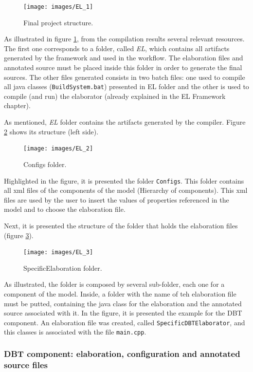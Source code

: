 \begin{figure}[H]
\centerline{
\texttt{[image: images/EL\_1]}
}
\caption{Final project structure.}
\label{fig:el_1} 
\end{figure}

As illustrated in figure \ref{fig:el_1}, from the compilation results several relevant resources. The first one corresponds to a folder, called \textit{EL}, which contains all artifacts generated by the framework and used in the workflow. The elaboration files and annotated source must be placed inside this folder in order to generate the final sources. The other files generated consists in two batch files: one used to compile all java classes (\texttt{BuildSystem.bat}) presented in EL folder and the other is used to compile (and run) the elaborator (already explained in the EL Framework chapter). 

As mentioned, \textit{EL} folder contains the artifacts generated by the compiler. Figure \ref{fig:el_2} shows its structure (left side).

\begin{figure}[H]
\centerline{
\texttt{[image: images/EL\_2]}
}
\caption{Configs folder.}
\label{fig:el_2} 
\end{figure}

Highlighted in the figure, it is presented the folder \texttt{Configs}. This folder contains all xml files of the components of the model (Hierarchy of components). This xml files are used by the user to insert the values of properties referenced in the model and to choose the elaboration file.

Next, it is presented the structure of the folder that holds the elaboration files (figure \ref{fig:el_3}). 

\begin{figure}[H]
\centerline{
\texttt{[image: images/EL\_3]}
}
\caption{SpecificElaboration folder.}
\label{fig:el_3} 
\end{figure}

As illustrated, the folder is composed by several sub-folder, each one for a component of the model. Inside, a folder with the name of teh elaboration file must be putted, containing the java class for the elaboration and the annotated source associated with it. In the figure, it is presented the example for the DBT component. An elaboration file was created, called \texttt{SpecificDBTElaborator}, and this classes is associated with the file \texttt{main.cpp}.


\subsubsection{DBT component: elaboration, configuration and annotated source files}

